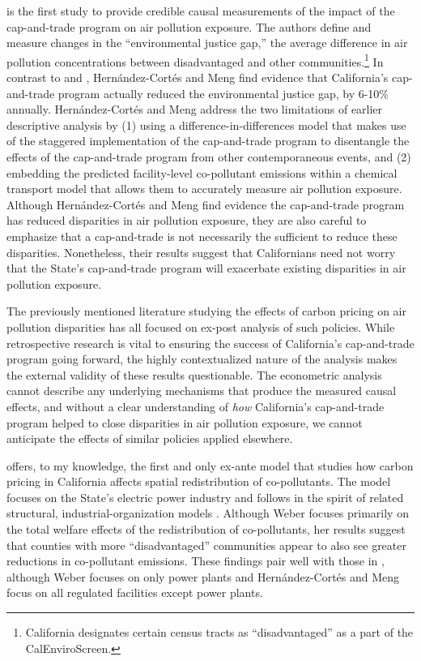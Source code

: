 \documentclass[11pt]{article}
\begin{document}
\cite{hernandez2023environmental} is the first study to provide credible causal measurements of the impact of the cap-and-trade program on air pollution exposure. The authors define and measure changes in the ``environmental justice gap,'' the average difference in air pollution concentrations between disadvantaged and other communities.\footnote{California designates certain census tracts as ``disadvantaged” as a part of the CalEnviroScreen.} In contrast to \cite{cushing2018carbon} and \cite{pastor2022up}, Hernández-Cortés and Meng find evidence that California's cap-and-trade program actually reduced the environmental justice gap, by 6-10\% annually. Hernández-Cortés and Meng address the two limitations of earlier descriptive analysis by (1) using a difference-in-differences model that makes use of the staggered implementation of the cap-and-trade program to disentangle the effects of the cap-and-trade program from other contemporaneous events, and (2) embedding the predicted facility-level co-pollutant emissions within a chemical transport model that allows them to accurately measure air pollution exposure. Although Hernández-Cortés and Meng find evidence the cap-and-trade program has reduced disparities in air pollution exposure, they are also careful to emphasize that a cap-and-trade is not necessarily the sufficient to reduce these disparities. Nonetheless, their results suggest that Californians need not worry that the State's cap-and-trade program will exacerbate existing disparities in air pollution exposure. 

The previously mentioned literature studying the effects of carbon pricing on air pollution disparities has all focused on ex-post analysis of such policies. While retrospective research is vital to ensuring the success of California's cap-and-trade program going forward, the highly contextualized nature of the analysis makes the external validity of these results questionable. The econometric analysis cannot describe any underlying mechanisms that produce the measured causal effects, and without a clear understanding of \emph{how} California's cap-and-trade program helped to close disparities in air pollution exposure, we cannot anticipate the effects of similar policies applied elsewhere. 

\cite{weber2021dynamic} offers, to my knowledge, the first and only ex-ante model that studies how carbon pricing in California affects spatial redistribution of co-pollutants. The model focuses on the State's electric power industry and follows in the spirit of related structural, industrial-organization models \citep[e.g.,~][]{gowrisankaran2022policy, abito2022role}. Although Weber focuses primarily on the total welfare effects of the redistribution of co-pollutants, her results suggest that counties with more ``disadvantaged” communities appear to also see greater reductions in co-pollutant emissions. These findings pair well with those in \cite{hernandez2023environmental}, although Weber focuses on only power plants and Hernández-Cortés and Meng focus on all regulated facilities except power plants.
\end{document}
